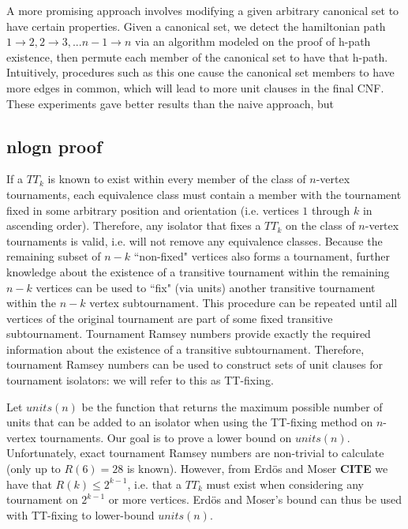 \documentclass[a4paper,UKenglish,cleveref, autoref, thm-restate]{lipics-v2021}
\begin{document}
A more promising approach involves modifying a given arbitrary canonical set to have certain properties. Given a canonical set, we detect the hamiltonian path $1\rightarrow 2,2\rightarrow 3,... n-1\rightarrow n$ via an algorithm modeled on the proof of h-path existence, then permute each member of the canonical set to have that h-path. Intuitively, procedures such as this one cause the canonical set members to have more edges in common, which will lead to more unit clauses in the final CNF. These experiments gave better results than the naive approach, but

\subsection{nlogn proof}
If a $TT_k$ is known to exist within every member of the class of $n$-vertex tournaments, each equivalence class must contain a member with the tournament fixed in some arbitrary position and orientation (i.e. vertices $1$ through $k$ in ascending order). Therefore, any isolator that fixes a $TT_k$ on the class of $n$-vertex tournaments is valid, i.e. will not remove any equivalence classes. Because the remaining subset of $n-k$ ``non-fixed" vertices also forms a tournament, further knowledge about the existence of a transitive tournament within the remaining $n-k$ vertices can be used to ``fix" (via units) another transitive tournament within the $n-k$ vertex subtournament. This procedure can be repeated until all vertices of the original tournament are part of some fixed transitive subtournament. Tournament Ramsey numbers provide exactly the required information about the existence of a transitive subtournament. Therefore, tournament Ramsey numbers can be used to construct sets of unit clauses for tournament isolators: we will refer to this as TT-fixing.

Let $units(n)$ be the function that returns the maximum possible number of units that can be added to an isolator when using the TT-fixing method on $n$-vertex tournaments. Our goal is to prove a lower bound on $units(n)$. Unfortunately, exact tournament Ramsey numbers are non-trivial to calculate (only up to $R(6) = 28$ is known). However, from Erd{\"o}s and Moser \textbf{CITE} we have that $R(k) \leq 2^{k-1}$, i.e. that a $TT_{k}$ must exist when considering any tournament on $2^{k-1}$ or more vertices. Erd{\"o}s and Moser's bound can thus be used with TT-fixing to lower-bound $units(n)$.
\end{document}
